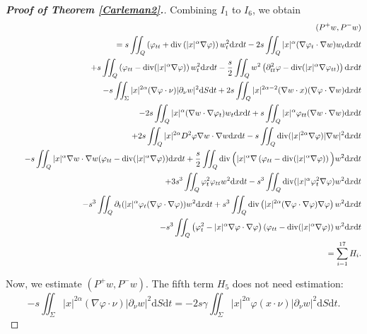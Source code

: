 \documentclass[11pt]{article}
\numberwithin{equation}{section}
\def\pt{\partial}
\def\vp{\varphi}
\def\bf{\textbf}
\def\pt{\partial}
\def\al{\alpha}
\def\ga{\gamma}
\def\f{\frac}
\def\df{\mathrm d}
\DeclareMathOperator{\Div}{div}
\begin{document}
\begin{proof}[{\rm \bf { Proof of  Theorem \ref{Carleman2}.}}]
			Combining  $I_1$ to $I_6$, we obtain
			\begin{eqnarray*}
				&&(P^+w,P^-w)\\
				&&=s\iint_Q\left(\vp_{tt}+\Div \left(|x|^\al \nabla\vp\right)\right) w_t^2\df x\df t-2s\iint_Q|x|^\al(\nabla\vp_t \cdot \nabla w) w_t\df x\df t\\ %
				&&\hspace{4.5mm}+s\iint_Q\left(\vp_{tt}-\Div (|x|^\al \nabla \vp)\right)w_t^2\df x\df t-\f{s}{2}\iint_Q w^2\left(\pt_{tt}^2\vp -\Div(|x|^\al \nabla \vp_{tt})\right)\df x\df t\\ %
				&&\hspace{4.5mm}-s\iint_\Sigma  |x|^{2\al}(\nabla \vp\cdot\nu) |\pt_\nu w|^2 \df S\df t+2s\iint_Q|x|^{2\al-2}(\nabla w\cdot x)(\nabla \vp\cdot \nabla w)\df x\df t\\
				&&\hspace{4.5mm}-2s\iint_Q|x|^\al (\nabla w\cdot \nabla \vp_t)w_t\df x\df t+s\iint_Q|x|^\al \vp_{tt}(\nabla w\cdot \nabla w)\df x\df t\\
				&&\hspace{4.5mm}+2s\iint_Q|x|^{2\al}D^2\vp\nabla w\cdot \nabla w\df x\df t-s\iint_Q\Div(|x|^{2\al}\nabla\vp)|\nabla w|^2\df x\df t\\ %
				&&\hspace{4.5mm} -s\iint_Q|x|^\al \nabla w\cdot \nabla w(\vp_{tt}-\Div(|x|^\al \nabla \vp))\df x\df t+\f{s}{2}\iint_Q\Div\Big(|x|^\al \nabla  \left(\vp_{tt}-\Div (|x|^\al \nabla \vp)\right) \Big) w^2\df x\df t \\ %
				&&\hspace{4.5mm} +3s^3\iint_Q \vp_t^2\vp_{tt}w^2\df x\df t-s^3\iint_Q\Div(|x|^\al \vp_t^2\nabla \vp)w^2\df x\df t\\
				&&\hspace{4.5mm}-s^3\iint_Q\pt_t(|x|^\al \vp_t(\nabla \vp\cdot \nabla \vp))w^2\df x\df t+s^3\iint_Q\Div\left(|x|^{2\al}(\nabla\vp\cdot \nabla\vp)\nabla\vp\right)w^2\df x\df t\\ %
				&&\hspace{4.5mm} -s^3\iint_Q\left(\vp_t^2-|x|^\al \nabla\vp\cdot \nabla\vp\right) \left(\vp_{tt}-\Div (|x|^\al \nabla\vp)\right)w^2 \df x\df t\\
				&&=\sum_{i=1}^{17} H_i.
			\end{eqnarray*}
			
			Now, we estimate $(P^+w,P^-w)$. The fifth term $H_5$  does not need estimation:
			\begin{equation*}
				-s\iint_\Sigma  |x|^{2\al}(\nabla \vp\cdot\nu) |\pt_\nu w|^2 \df S\df t =-2s\ga \iint_\Sigma |x|^{2\al}  \vp (x\cdot \nu)|\pt_\nu w|^2\df S\df t.
			\end{equation*}
			

\end{proof}
\end{document}
